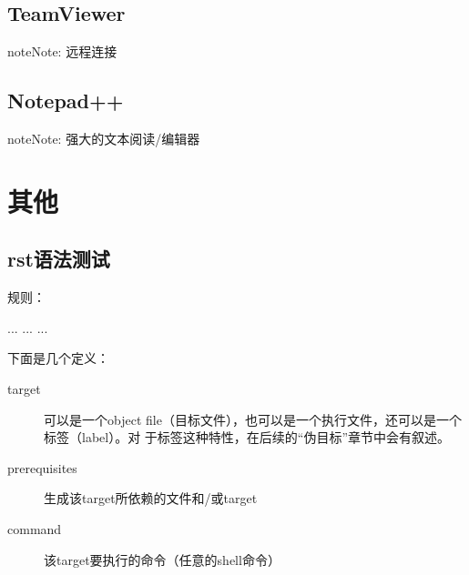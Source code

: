 \documentclass[letterpaper,10pt,english]{sphinxmanual}
\begin{document}


\section{TeamViewer}
\label{\detokenize{softwares/index:teamviewer}}
\begin{sphinxadmonition}{note}{Note:}
远程连接
\end{sphinxadmonition}



\section{Notepad++}
\label{\detokenize{softwares/index:notepad}}
\begin{sphinxadmonition}{note}{Note:}
强大的文本阅读/编辑器
\end{sphinxadmonition}



\chapter{其他}
\label{\detokenize{else/index::doc}}\label{\detokenize{else/index:id1}}

\section{rst语法测试}
\label{\detokenize{else/01_test_code:rst}}\label{\detokenize{else/01_test_code::doc}}
 规则：

%
\begin{sphinxVerbatim}[commandchars=\\\{\}]
  ...
    ...
    ...
\end{sphinxVerbatim}

下面是几个定义：
\begin{description}
\item[{target}] \leavevmode
可以是一个object file（目标文件），也可以是一个执行文件，还可以是一个标签（label）。对
于标签这种特性，在后续的“伪目标”章节中会有叙述。

\item[{prerequisites}] \leavevmode
生成该target所依赖的文件和/或target

\item[{command}] \leavevmode
该target要执行的命令（任意的shell命令）

\end{description}
\end{document}
